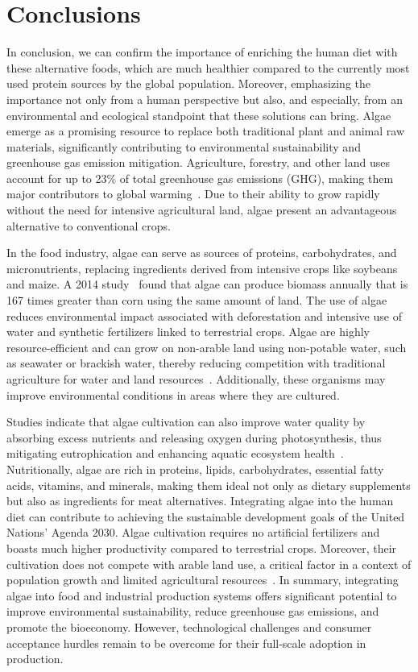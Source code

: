 \section{Conclusions}
In conclusion, we can confirm the importance of enriching the human diet with these alternative foods, which are much healthier compared to the currently most used protein sources by the global population. Moreover, emphasizing the importance not only from a human perspective but also, and especially, from an environmental and ecological standpoint that these solutions can bring. Algae emerge as a promising resource to replace both traditional plant and animal raw materials, significantly contributing to environmental sustainability and greenhouse gas emission mitigation. Agriculture, forestry, and other land uses account for up to \num{23}\% of total greenhouse gas emissions (GHG), making them major contributors to global warming~\parencite{gonzalez_Meat_2020}.
Due to their ability to grow rapidly without the need for intensive agricultural land, algae present an advantageous alternative to conventional crops.

In the food industry, algae can serve as sources of proteins, carbohydrates, and micronutrients, replacing ingredients derived from intensive crops like soybeans and maize. A 2014 study~\parencite{ullah_Algal_2014} found that algae can produce biomass annually that is 167 times greater than corn using the same amount of land. The use of algae reduces environmental impact associated with deforestation and intensive use of water and synthetic fertilizers linked to terrestrial crops. Algae are highly resource-efficient and can grow on non-arable land using non-potable water, such as seawater or brackish water, thereby reducing competition with traditional agriculture for water and land resources~\parencite{diaz_Developing_2023}.
Additionally, these organisms may improve environmental conditions in areas where they are cultured.

Studies indicate that algae cultivation can also improve water quality by absorbing excess nutrients and releasing oxygen during photosynthesis, thus mitigating eutrophication and enhancing aquatic ecosystem health~\parencite{espinosa-ramirez_Algae_2023}. Nutritionally, algae are rich in proteins, lipids, carbohydrates, essential fatty acids, vitamins, and minerals, making them ideal not only as dietary supplements but also as ingredients for meat alternatives. Integrating algae into the human diet can contribute to achieving the sustainable development goals of the United Nations' Agenda 2030. Algae cultivation requires no artificial fertilizers and boasts much higher productivity compared to terrestrial crops. Moreover, their cultivation does not compete with arable land use, a critical factor in a context of population growth and limited agricultural resources~\parencite{boukid_Algae_2022}. In summary, integrating algae into food and industrial production systems offers significant potential to improve environmental sustainability, reduce greenhouse gas emissions, and promote the bioeconomy. However, technological challenges and consumer acceptance hurdles remain to be overcome for their full-scale adoption in production.
